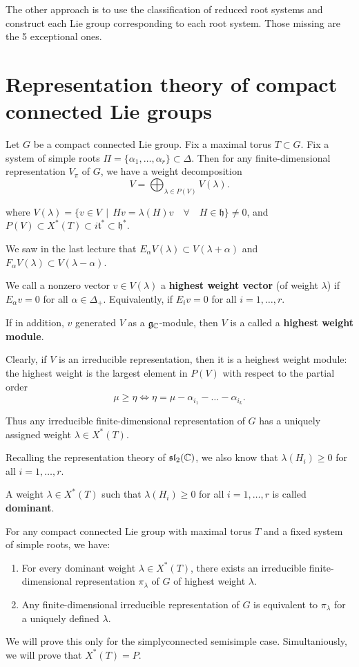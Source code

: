 \documentclass[11pt, english]{article}
\begin{document}
The other approach is to use the classification of reduced root systems and construct each Lie group corresponding to each root system. Those missing are the 5 exceptional ones.


\newpage
\section{Representation theory of compact connected Lie groups}

Let $G$ be a compact connected Lie group. Fix a maximal torus $T \subset G$. Fix a system of simple roots $\Pi = \{ \alpha_1, \ldots, \alpha_r \} \subset \Delta$. Then for any finite-dimensional representation $V_\pi$ of $G$, we have a weight decomposition
$$
V = \bigoplus_{\lambda \in P(V)} V(\lambda).
$$

where $V(\lambda) = \{ v \in V \, \mid \, Hv = \lambda(H) v \quad \forall \quad H \in \mathfrak h\} \neq 0$, and $P(V) \subset X^\ast(T) \subset i \mathfrak t^\ast \subset \mathfrak h^\ast$.

We saw in the last lecture that $E_\alpha V(\lambda) \subset V(\lambda + \alpha)$ and $F_\alpha V(\lambda) \subset V(\lambda-\alpha)$. 

We call a nonzero vector $v \in V(\lambda)$ a \textbf{highest weight vector} (of weight $\lambda$) if $E_\alpha v = 0$ for all $\alpha \in \Delta_+$. Equivalently, if $E_i v = 0$ for all $i=1,\ldots,r$. 

If in addition, $v$ generated $V$ as a $\mathfrak g_{\mathbb{C}}$-module, then $V$ is a called a \textbf{highest weight module}. 

Clearly, if $V$ is an irreducible representation, then it is a heighest weight module: the highest weight is the largest element in $P(V)$ with respect to the partial order
$$
\mu \geq \eta \Leftrightarrow \eta = \mu - \alpha_{i_1}-\ldots-\alpha_{i_k}.
$$

Thus any irreducible finite-dimensional representation of $G$ has a uniquely assigned weight $\lambda \in X^\ast(T)$. 

Recalling the representation theory of $\mathfrak{sl}_2(\mathbb{C})$, we also know that $\lambda(H_i) \geq 0$ for all $i=1,\ldots,r$. 

A weight $\lambda \in X^\ast(T)$ such that $\lambda(H_i) \geq 0$ for all $i=1,\ldots,r$ is called \textbf{dominant}. 

\begin{thm}
  For any compact connected Lie group with maximal torus $T$ and a fixed system of simple roots, we have:
  \begin{enumerate}
  \item For every dominant weight $\lambda \in X^\ast(T)$, there exists an irreducible finite-dimensional representation $\pi_\lambda$ of $G$ of highest weight $\lambda$.
\item Any finite-dimensional irreducible representation of $G$ is equivalent to $\pi_\lambda$ for a uniquely defined $\lambda$.
  \end{enumerate}
\end{thm}
We will prove this only for the simplyconnected semisimple case. Simultaniously, we will prove that $X^\ast(T)=P$. 
\end{document}
